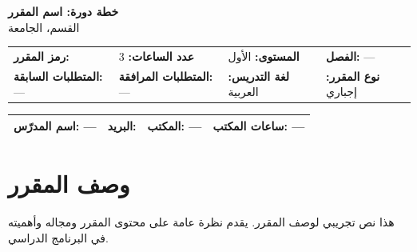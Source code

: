 \documentclass[11pt,a4paper]{article}
\begin{document}
\begin{center}
{\LARGE\bfseries خطة دورة: اسم المقرر}\\[0.5em]
{\Large القسم، الجامعة}\\[1em]
\end{center}

\begin{table}[H]
\centering
\renewcommand{\arraystretch}{1.4}
\begin{tabularx}{\textwidth}{L{4cm} X L{4cm} X}
\toprule
\textbf{رمز المقرر:}  & \textbf{عدد الساعات:} 3 & \textbf{المستوى:} الأول & \textbf{الفصل:} --- \\
\textbf{المتطلبات السابقة:} --- & \textbf{المتطلبات المرافقة:} --- & \textbf{لغة التدريس:} العربية & \textbf{نوع المقرر:} إجباري \\
\bottomrule
\end{tabularx}
\end{table}

\vspace{1em}

\begin{table}[H]
\centering
\renewcommand{\arraystretch}{1.3}
\begin{tabularx}{\textwidth}{L{4cm} X L{4cm} X}
\toprule
\textbf{اسم المدرّس:} --- & \textbf{البريد:}  & \textbf{المكتب:} --- & \textbf{ساعات المكتب:} --- \\
\bottomrule
\end{tabularx}
\end{table}

\vspace{1em}

\section{وصف المقرر}
\label{sec:description}

هذا نص تجريبي لوصف المقرر. يقدم نظرة عامة على محتوى المقرر ومجاله وأهميته في البرنامج الدراسي.

\end{document}
